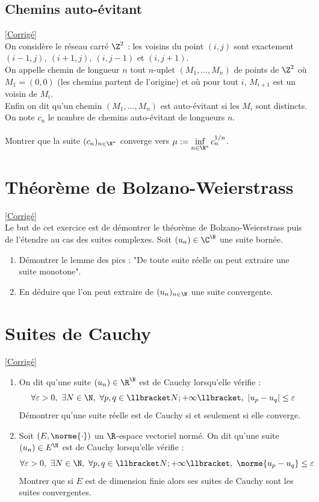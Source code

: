 \documentclass{book}
\begin{document}
	\subsection{Chemins auto-évitant}
	\textcolor{blue}{\hyperref[Chemins auto-évitant corrigé]{[Corrigé]}}\\
	\label{Chemins auto-évitant}
	On considère le réseau carré $\Z^2$ : les voisins du point $(i,j)$ sont exactement $(i-1,j),\ (i+1,j),\ (i,j-1)$ et $(i,j+1)$.\\
	On appelle chemin de longueur $n$ tout $n$-uplet $(M_1,\dots,M_n)$ de points de $\Z^2$ où $M_1=(0,0)$ (les chemins partent de l'origine) et où pour tout $i$, $M_{i+1}$ est un voisin de $M_i$.\\
	Enfin on dit qu'un chemin $(M_1,\dots,M_n)$ est auto-évitant si les $M_i$ sont distincts. On note $c_n$ le nombre de chemins auto-évitant de longueurs $n$.\\\\
	Montrer que la suite $(c_n)_{n\in \N^*}$ converge vers $\mu:=\inf\limits_{n\in \N^*}c_n^{1/n}$.
	
	\section{Théorème de Bolzano-Weierstrass }
	\textcolor{blue}{\hyperref[sec:theoreme-de-bolzano-weierstrass-etoile3]{[Corrigé]}}\\
	\label{Théorème de Bolzano-Weierstrass}
	Le but de cet exercice est de démontrer le théorème de Bolzano-Weierstrass puis de l'étendre au cas des suites complexes. Soit $(u_n)\in \C^\N$ une suite bornée.
	\begin{enumerate}
		\item Démontrer le lemme des pics : "De toute suite réelle on peut extraire une suite monotone".
		\item En déduire que l'on peut extraire de $(u_n)_{n\in \N}$ une suite convergente.
	\end{enumerate}
	
	\section{Suites de Cauchy }
	\textcolor{blue}{\hyperref[Suites de Cauchy corrigé]{[Corrigé]}}\\
	\label{Suites de Cauchy}
	\begin{enumerate}[leftmargin=*]
		\item On dit qu'une suite $(u_n)\in \R^\N$ est de Cauchy lorsqu'elle vérifie :
		$$\forall \varepsilon>0,\ \exists N\in \N,\ \forall p,q\in \llbracket N;+\infty\llbracket,\ |u_p-u_q|\leq \varepsilon$$
		Démontrer qu'une suite réelle est de Cauchy si et seulement si elle converge.
		\item Soit $(E,\norme{\cdot})$ un $\R$-espace vectoriel normé. On dit qu'une suite $(u_n)\in E^\N$ est de Cauchy lorsqu'elle vérifie :
		$$\forall \varepsilon>0,\ \exists N\in \N,\ \forall p,q\in \llbracket N;+\infty\llbracket,\ \norme{u_p-u_q}\leq \varepsilon$$
		Montrer que si $E$ est de dimension finie alors ses suites de Cauchy sont les suites convergentes.
	\end{enumerate}
	
\end{document}
